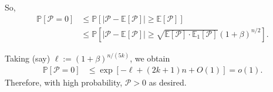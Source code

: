 \documentclass[11pt]{article}
\theoremstyle{definition}
\theoremstyle{plain}
\begin{document}
So, 
\begin{align*}
\mathbb{P}[\mathcal{P} = 0] 
&\leq \mathbb{P}\left[ |\mathcal{P} - \mathbb{E}[\mathcal{P}]| \geq \mathbb{E}[\mathcal{P}] \right] \\
&\leq \mathbb{P}\left[ |\mathcal{P} - \mathbb{E}[\mathcal{P}]| \geq \sqrt{\mathbb{E}[\mathcal{P}] \cdot \mathbb{E}_1[\mathcal{P}]}   (1+\beta)^{n/2}\right].
\end{align*}

Taking (say) \( \ell := (1 + \beta)^{n / (5k)} \), we obtain
\begin{align*}
\mathbb{P}[\mathcal{P} = 0] &\leq \exp\left[ -\ell + (2k + 1)n +O(1) \right] = o(1).
\end{align*}
Therefore, with high probability, \( \mathcal{P} > 0 \) as desired.



\printbibliography
\end{document}
